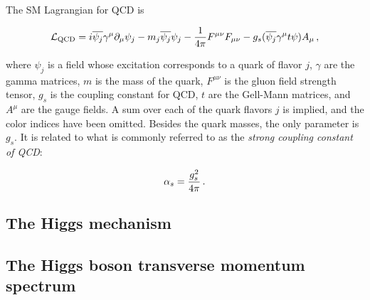 The SM Lagrangian for QCD is~\cite{griffiths}
% 
\begin{linenomath*}
\begin{equation}
\mathcal{L}_\text{QCD} =
    i \overline{\psi_j} \gamma^\mu \partial_\mu \psi_j
    - m_j \overline{\psi_j} \psi_j
    - \frac{1}{4\pi} F^{\mu\nu} F_{\mu\nu} 
    - g_s (\overline{\psi_j} \gamma^\mu t \psi) A_\mu
\,,
\end{equation}
\end{linenomath*}
% 
where $\psi_j$ is a field whose excitation corresponds to a quark of flavor $j$, $\gamma$ are the gamma matrices, $m$ is the mass of the quark, $F^{\mu\nu}$ is the gluon field strength tensor, $g_s$ is the coupling constant for QCD, $t$ are the Gell-Mann matrices, and $A^\mu$ are the gauge fields.
% 
A sum over each of the quark flavors $j$ is implied, and the color indices have been omitted.
% 
Besides the quark masses, the only parameter is $g_s$.
% 
It is related to what is commonly referred to as the \textit{strong coupling constant of QCD}:
% 
\begin{linenomath*}
\begin{equation}
\alpha_s = \frac{g_s^2}{4\pi}
\,.
\end{equation}
\end{linenomath*}
% 


\subsection{The Higgs mechanism}





\subsection{The Higgs boson transverse momentum spectrum}




